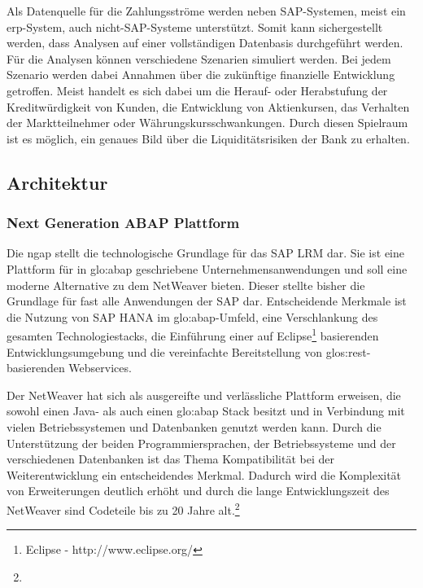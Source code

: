 \begin{onehalfspacing}
Als Datenquelle für die Zahlungsströme werden neben SAP-Systemen, meist ein \gls{erp}-System, auch nicht-SAP-Systeme unterstützt. Somit kann sichergestellt werden, dass Analysen auf einer vollständigen Datenbasis durchgeführt werden. Für die Analysen können verschiedene Szenarien simuliert werden. Bei jedem Szenario werden dabei Annahmen über die zukünftige finanzielle Entwicklung getroffen. Meist handelt es sich dabei um die Herauf- oder Herabstufung der Kreditwürdigkeit von Kunden, die Entwicklung von Aktienkursen, das Verhalten der Marktteilnehmer oder Währungskursschwankungen. Durch diesen Spielraum ist es möglich, ein genaues Bild über die Liquiditätsrisiken der Bank zu erhalten.


\subsection{Architektur}

\subsubsection{Next Generation ABAP Plattform}
Die \gls{ngap} stellt die technologische Grundlage für das SAP LRM dar. Sie ist eine Plattform für in \gls{glo:abap} geschriebene Unternehmensanwendungen und soll eine moderne Alternative zu dem \gls{NetWeaver} bieten. Dieser stellte bisher die Grundlage für fast alle Anwendungen der SAP dar. Entscheidende Merkmale ist die Nutzung von SAP HANA im \gls{glo:abap}-Umfeld, eine Verschlankung des gesamten Technologiestacks, die Einführung einer auf Eclipse\footnote{Eclipse - http://www.eclipse.org/} basierenden Entwicklungsumgebung und die vereinfachte Bereitstellung von \gls{glos:rest}-basierenden Webservices.

Der \gls{NetWeaver} hat sich als ausgereifte und verlässliche Plattform erweisen, die sowohl einen Java- als auch einen \gls{glo:abap} Stack besitzt und in Verbindung mit vielen Betriebssystemen und Datenbanken genutzt werden kann. Durch die Unterstützung der beiden Programmiersprachen, der Betriebssysteme und der verschiedenen Datenbanken ist das Thema Kompatibilität bei der Weiterentwicklung ein entscheidendes Merkmal. Dadurch wird die Komplexität von Erweiterungen deutlich erhöht und durch die lange Entwicklungszeit des \gls{NetWeaver} sind Codeteile bis zu 20 Jahre alt.\footnote{ }


\end{onehalfspacing}
